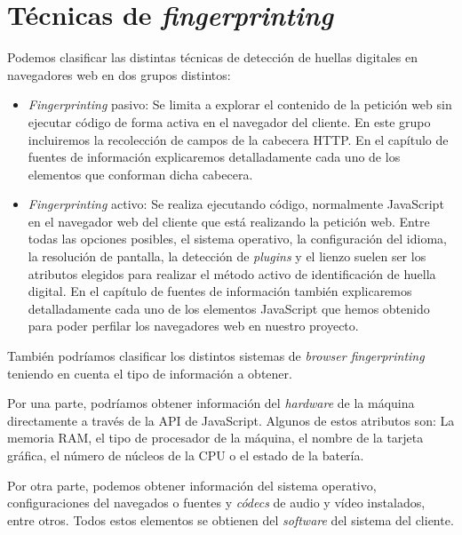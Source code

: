 \section{Técnicas de \textit{fingerprinting}}

Podemos clasificar las distintas técnicas de detección de huellas digitales en navegadores web en dos grupos distintos:

\begin{itemize}
	\item \textit{Fingerprinting} pasivo: Se limita a explorar el contenido de la petición web sin ejecutar código de forma activa en el navegador del cliente. En este grupo incluiremos la recolección de campos de la cabecera HTTP. En el capítulo de fuentes de información explicaremos detalladamente cada uno de los elementos que conforman dicha cabecera.
	
	\item \textit{Fingerprinting} activo:  Se realiza ejecutando código, normalmente JavaScript en el navegador web del cliente que está realizando la petición web. Entre todas las opciones posibles, el sistema operativo, la configuración del idioma, la resolución de pantalla, la detección de \textit{plugins} y el lienzo suelen ser los atributos elegidos para realizar el método activo de identificación de huella digital. En el capítulo de fuentes de información también explicaremos detalladamente cada uno de los elementos JavaScript que hemos obtenido para poder perfilar los navegadores web en nuestro proyecto.
	
\end{itemize}

También podríamos clasificar los distintos sistemas de \textit{browser fingerprinting} teniendo en cuenta el tipo de información a obtener. \par 

Por una parte, podríamos obtener información del \textit{hardware} de la máquina directamente a través de la API de JavaScript. Algunos de estos atributos son: La memoria RAM, el tipo de procesador de la máquina, el nombre de la tarjeta gráfica, el número de núcleos de la CPU o el estado de la batería. \par

Por otra parte, podemos obtener información del sistema operativo, configuraciones del navegados o fuentes y \textit{códecs} de audio y vídeo instalados, entre otros. Todos estos elementos se obtienen del \textit{software} del sistema del cliente. \par 

